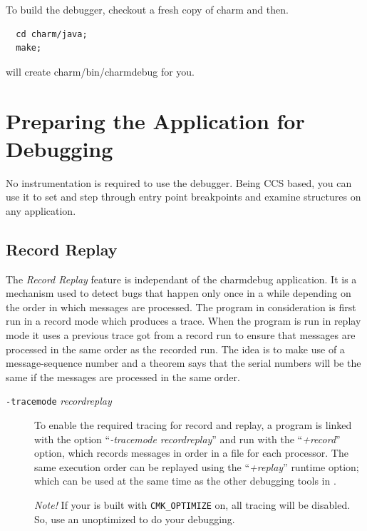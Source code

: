 \documentclass[10pt,dvips]{article}
\begin{document}
To build the debugger, checkout a fresh copy of charm and then.

\begin{verbatim}
  cd charm/java;
  make;
\end{verbatim}

will create charm/bin/charmdebug for you. 

\section{Preparing the \charmpp Application for Debugging}

No instrumentation is required to use the \charmpp{} debugger.  Being
CCS based, you can use it to set and step through entry point
breakpoints and examine \charmpp{} structures on any \charmpp{}
application.

\subsection{Record Replay}

The \textit{Record Replay} feature is independant of the charmdebug
application.  It is a mechanism used to detect bugs that happen only
once in a while depending on the order in which messages are
processed. The program in consideration is first run in a record mode
which produces a trace. When the program is run in replay mode it uses
a previous trace got from a record run to ensure that messages are
processed in the same order as the recorded run. The idea is to make
use of a message-sequence number and a theorem says that the serial
numbers will be the same if the messages are processed in the same
order. \cite{rashmithesis}

\begin{description}

\item[{\tt -tracemode} {\em recordreplay}]

To enable the required tracing for record and replay, a \charmpp{} 
program is linked with the option ``\textit{-tracemode recordreplay}''
and run with the ``\textit{+record}'' option, which records messages
in order in a file for each processor.  The same execution order can be 
replayed using the ``\textit{+replay}'' runtime option; which can be 
used at the same time as the other debugging tools in \charmpp{}.

\emph{ Note! } If your \charmpp{} is built with {\tt CMK\_OPTIMIZE} on, all tracing will be disabled.  So, use an unoptimized \charmpp{} to do your debugging.

\end{description}
\end{document}
